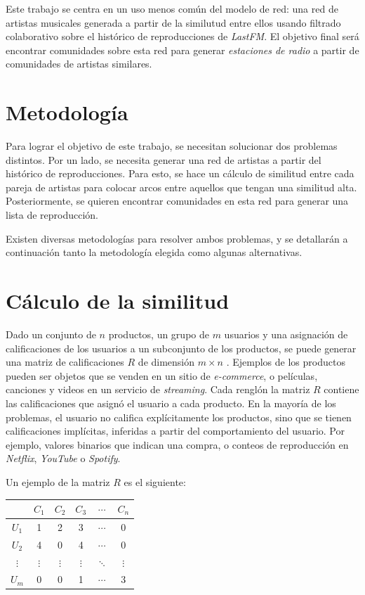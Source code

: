 \documentclass[conference]{IEEEtran}
\begin{document}
Este trabajo se centra en un uso menos común del modelo de red: una red de artistas musicales generada a partir de la similutud entre ellos usando filtrado colaborativo sobre el histórico de reproducciones de \textit{LastFM}. El objetivo final será encontrar comunidades sobre esta red para generar \textit{estaciones de radio} a partir de comunidades de artistas similares.

\section{Metodología}

Para lograr el objetivo de este trabajo, se necesitan solucionar dos problemas distintos. Por un lado, se necesita generar una red de artistas a partir del histórico de reproducciones. Para esto, se hace un cálculo de similitud entre cada pareja de artistas para colocar arcos entre aquellos que tengan una similitud alta. Posteriormente, se quieren encontrar comunidades en esta red para generar una lista de reproducción.

Existen diversas metodologías para resolver ambos problemas, y se detallarán a continuación tanto la metodología elegida como algunas alternativas.

\section{Cálculo de la similitud}

Dado un conjunto de $n$ productos, un grupo de $m$ usuarios y una asignación de calificaciones de los usuarios a un subconjunto de los productos, se puede generar una matriz de calificaciones $R$ de dimensión $m \times n$ . Ejemplos de los productos pueden ser objetos que se venden en un sitio de \textit{e-commerce}, o películas, canciones y videos en un servicio de \textit{streaming}. Cada renglón la matriz $R$ contiene las calificaciones que asignó el usuario a cada producto. En la mayoría de los problemas, el usuario no califica explícitamente los productos, sino que se tienen calificaciones implícitas, inferidas a partir del comportamiento del usuario. Por ejemplo, valores binarios que indican una compra, o conteos de reproducción en \textit{Netflix}, \textit{YouTube} o \textit{Spotify}.

Un ejemplo de la matriz $R$ es el siguiente:

\begin{center}
    \begin{tabular}{ c | c  c c c c}
        & $C_1$ & $C_2$ & $C_3$ & $\cdots$ & $C_n$ \\
      \hline                       
      $U_1$ &   1 &     2 &     3 & $\cdots$ &      0 \\
      $U_2$ &   4 &     0 &     4 & $\cdots$  &     0\\
      $\vdots$ & $\vdots$ & $\vdots$ & $\vdots$ & $\ddots$ & $\vdots$\\
      $U_m$ &   0 &     0 &     1 & $\cdots$ &      3\\
      \hline  
    \end{tabular}
\end{center}
\end{document}

